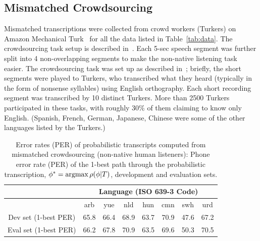 \subsection{Mismatched Crowdsourcing}
\label{sec:methodsmc}

Mismatched transcriptions were collected from crowd workers (Turkers)
on Amazon Mechanical Turk~\cite{MTurk} for all the data listed in
Table~\ref{tab:data}.  The crowdsourcing task setup is described
in~\cite{JHJ15b}.  Each 5-sec speech segment was further split into 4
non-overlapping segments to make the non-native listening task
easier. The crowdsourcing task was set up as described
in~\cite{JHJ15b}; briefly, the short segments were played to Turkers,
who transcribed what they heard (typically in the form of nonsense
syllables) using English orthography. Each short recording segment was
transcribed by 10 distinct Turkers. More than 2500 Turkers
participated in these tasks, with roughly 30\% of them claiming to
know only English. (Spanish, French, German, Japanese, Chinese were
some of the other languages listed by the Turkers.)

\begin{table}[t]
\centering
\begin{tabular}{|c||c|c|c|c|c|c|c|}
  \hline
  & \multicolumn{7}{|c|}{Language (ISO 639-3 Code)}\\ \hline
& arb & yue & nld & hun & cmn & swh & urd \\ \hline\hline
Dev set (1-best PER) & 65.8 & 66.4 & 68.9 & 63.7 & 70.9 & 47.6 & 67.2 \\
Eval set (1-best PER) & 66.2 & 67.8 & 70.9 & 63.5 & 69.6 & 50.3 & 70.5 \\\hline
\end{tabular}
\caption{Error rates (PER) of probabilistic transcripts computed from
  mismatched crowdsourcing (non-native human listeners): Phone error
  rate (PER) of the 1-best path through the probabilistic
  transcription, $\phi^*=\operatorname*{argmax}\rho(\phi|T)$, development and
  evaluation sets.}
\label{tab:LPER}
\end{table}

